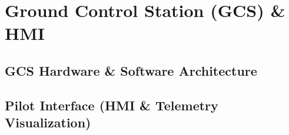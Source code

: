 ﻿\chapter{Ground Control Station (GCS) \& HMI}
\label{ch:gcs_hmi}
\section{GCS Hardware \& Software Architecture}
\section{Pilot Interface (HMI \& Telemetry Visualization)}
